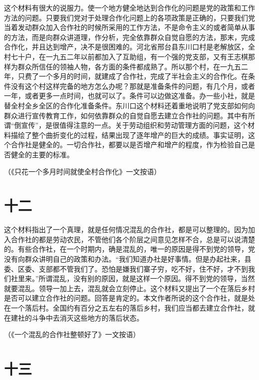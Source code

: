 这个材料有很大的说服力。使一个地方健全地达到合作化的问题是党的政策和工作方法的问题。只要我们党对于处理合作化问题上的各项政策是正确的，只要我们党当着发动群众加入合作社的时候所采用的工作方法，不是命令主义的或者简单从事的方法，而是向群众讲道理，作分析，完全依靠群众自觉自愿的方法，那末，完成合作化，并且达到增产，决不是很困难的。河北省邢台县东川口村是老解放区，全村七十户，在一九五二年以前都加入了互助组，有一个强的党支部，又有王志棋那样为群众所信任的领袖人物，各方面的条件都成熟了。所以那个村，在一九五二年，只费了一个多月的时间，就建成了合作社，完成了半社会主义的合作化。在条件没有这个村这样完备的地方怎么办呢？那就是准备条件的问题，有几个月，或者一年，或者更多一点时间，也就可以了。条件可以边做这准备。办一些小社，就是替全村全乡全区的合作化准备条件。东川口这个材料还着重地说明了党支部如何向群众进行宣传教育工作，如何依靠群众的自觉自愿去建立合作社的问题。其中有所谓“倒宣传”，是很值得注意的一点。关于劳动组织和劳动管理方面的问题，这个材料描绘了整个曲折变化的过程，结果出现了逐年增产的巨大的成绩。事实证明，这个合作社是健全的。一切合作社，都要以是否增产和增产的程度，作为检验自己是否健全的主要的标准。


（《只花一个多月时间就使全村合作化》一文按语）

\section*{十二}

这个材料指出了一个真理，就是任何情况混乱的合作社，都是可以整理的。因为加入合作社的都是劳动农民，不管他们各个阶层之间意见怎样不合，总是可以说清楚的。有些合作社，在一个时期内，确是混乱的，唯一的原因是得不到党的领导，党没有向群众讲明自己的政策和办法。“我们知道办社是好事情。但是办起社来，县委、区委、支部都不管我们了。恐怕是嫌我们寨子穷，吃不好，住不好，才不到我们社里来。”所谓混乱，没有别的原因，就是这样一个原因。得不到党的领导，当然就要混乱。领导一加上去，混乱就会立刻停止。这个材料又提出了一个在落后乡村是否可以建立合作社的问题。回答是肯定的。本文作者所说的这个合作社，就是处在一个落后村。全国约有百分之五左右的落后乡村，我们应当都去建立合作社，就在建社的斗争中去消灭这些地方的落后状态。


（《一个混乱的合作社整顿好了》一文按语）

\section*{十三}

